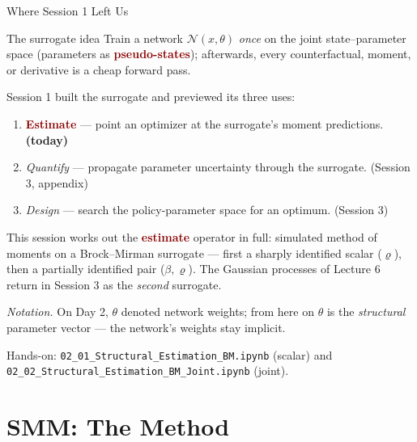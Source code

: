 \documentclass[10pt,aspectratio=169]{beamer}
\newcommand{\emphc}[1]{\textbf{\textcolor{darkred}{#1}}}
\begin{document}
\begin{frame}{Where Session 1 Left Us}
\small
\begin{block}{The surrogate idea}
Train a network $\mathcal{N}(x, \theta)$ \emph{once} on the joint state--parameter space (parameters as \emphc{pseudo-states}); afterwards, every counterfactual, moment, or derivative is a cheap forward pass.
\end{block}

\vspace{0.4em}
Session 1 built the surrogate and previewed its three uses:
\begin{enumerate}\itemsep2pt
    \item \emphc{Estimate} --- point an optimizer at the surrogate's moment predictions. \textbf{(today)}
    \item \emph{Quantify} --- propagate parameter uncertainty through the surrogate. (Session 3, appendix)
    \item \emph{Design} --- search the policy-parameter space for an optimum. (Session 3)
\end{enumerate}

\vspace{0.4em}
This session works out the \emphc{estimate} operator in full: simulated method of moments on a Brock--Mirman surrogate --- first a sharply identified scalar ($\varrho$), then a partially identified pair ($\beta, \varrho$).  The Gaussian processes of Lecture 6 return in Session 3 as the \emph{second} surrogate.

\vspace{0.2em}
{\footnotesize \emph{Notation.} On Day 2, $\theta$ denoted network weights; from here on $\theta$ is the \emph{structural} parameter vector --- the network's weights stay implicit.}

\vspace{0.3em}
\begin{center}
{\scriptsize Hands-on: \texttt{02\_01\_Structural\_Estimation\_BM.ipynb} (scalar) and \texttt{02\_02\_Structural\_Estimation\_BM\_Joint.ipynb} (joint).}
\end{center}
\end{frame}


\section{SMM: The Method}
\end{document}
